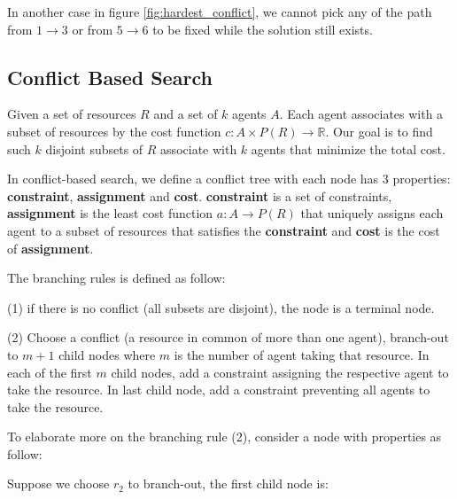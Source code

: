 In another case in figure \ref{fig:hardest_conflict}, we cannot pick any of the path from $1 \to 3$ or from $5 \to 6$ to be fixed while the solution still exists.

\subsection{Conflict Based Search}

Given a set of resources $R$ and a set of  $k$ agents $A$. Each agent associates with a subset of resources by the cost function $c: A \times P(R) \to \mathbb{R}$. Our goal is to find such $k$ disjoint subsets of $R$ associate with $k$ agents that minimize the total cost. 

In conflict-based search, we define a conflict tree with each node has 3 properties: \textbf{constraint}, \textbf{assignment} and \textbf{cost}. \textbf{constraint} is a set of constraints, \textbf{assignment} is the least cost function $a: A \to P(R)$ that uniquely assigns each agent to a subset of resources that satisfies the \textbf{constraint} and \textbf{cost} is the cost of \textbf{assignment}.
    
The branching rules is defined as follow:
    
(1) if there is no conflict (all subsets are disjoint), the node is a terminal node.
    
(2) Choose a conflict (a resource in common of more than one agent), branch-out to $m+1$ child nodes where $m$ is the number of agent taking that resource. In each of the first $m$ child nodes, add a constraint assigning the respective agent to take the resource. In last child node, add a constraint preventing all agents to take the resource.
    
To elaborate more on the branching rule (2), consider a node with properties as follow:
    
    
    
Suppose we choose $r_2$ to branch-out, the first child node is:
    

